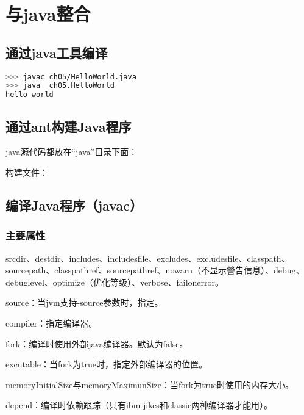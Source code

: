 \chapter{与java整合}

\section{通过java工具编译}

\begin{lstlisting}[language=Bash]
>>> javac ch05/HelloWorld.java 
>>> java  ch05.HelloWorld 
hello world
\end{lstlisting}






\section{通过ant构建Java程序}

java源代码都放在“java”目录下面：



构建文件：









\section{编译Java程序（javac）}

\subsection{主要属性}

srcdir、destdir、includes、includesfile、excludes、excludesfile、classpath、sourcepath、classpathref、sourcepathref、nowarn（不显示警告信息）、debug、debuglevel、optimize（优化等级）、verbose、failonerror。

source：当jvm支持-source参数时，指定。

compiler：指定编译器。

fork：编译时使用外部java编译器。默认为false。

excutable：当fork为true时，指定外部编译器的位置。

memoryInitialSize与memoryMaximunSize：当fork为true时使用的内存大小。

depend：编译时依赖跟踪（只有ibm-jikes和classic两种编译器才能用）。

